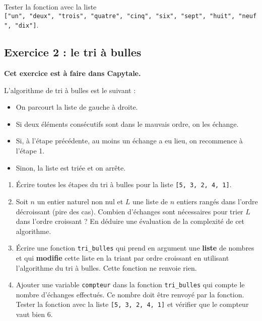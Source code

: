 \documentclass[
  a4paper,
  DIV=11,
  numbers=noendperiod]{scrartcl}
\providecommand{\tightlist}{%
  \setlength{\itemsep}{0pt}\setlength{\parskip}{0pt}}\usepackage{longtable,booktabs,array}
\begin{document}
Tester la fonction avec la liste
\texttt{{[}"un",\ "deux",\ "trois",\ "quatre",\ "cinq",\ "six",\ "sept",\ "huit",\ "neuf",\ "dix"{]}}.

\hypertarget{fa-desktop-exercice-2-le-tri-uxe0-bulles}{%
\subsection{\texorpdfstring{ Exercice 2 : le tri à
bulles}{ Exercice 2 : le tri à bulles}}\label{fa-desktop-exercice-2-le-tri-uxe0-bulles}}

\textbf{Cet exercice est à faire dans Capytale.}

L'algorithme de tri à bulles est le suivant :

\begin{itemize}
\tightlist
\item
  On parcourt la liste de gauche à droite.
\item
  Si deux éléments consécutifs sont dans le mauvais ordre, on les
  échange.
\item
  Si, à l'étape précédente, au moins un échange a eu lieu, on recommence
  à l'étape 1.
\item
  Sinon, la liste est triée et on arrête.
\end{itemize}

\begin{enumerate}
\def\labelenumi{\arabic{enumi}.}
\tightlist
\item
  Écrire toutes les étapes du tri à bulles pour la liste
  \texttt{{[}5,\ 3,\ 2,\ 4,\ 1{]}}.
\item
  Soit \(n\) un entier naturel non nul et \(L\) une liste de \(n\)
  entiers rangés dans l'ordre décroissant (pire des cas). Combien
  d'échanges sont nécessaires pour trier \(L\) dans l'ordre croissant ?
  En déduire une évaluation de la complexité de cet algorithme.
\item
  Écrire une fonction \texttt{tri\_bulles} qui prend en argument une
  \textbf{liste} de nombres et qui \textbf{modifie} cette liste en la
  triant par ordre croissant en utilisant l'algorithme du tri à bulles.
  Cette fonction ne renvoie rien.
\item
  Ajouter une variable \texttt{compteur} dans la fonction
  \texttt{tri\_bulles} qui compte le nombre d'échanges effectués. Ce
  nombre doit être renvoyé par la fonction. Tester la fonction avec la
  liste \texttt{{[}5,\ 3,\ 2,\ 4,\ 1{]}} et vérifier que le compteur
  vaut bien 6.
\end{enumerate}
\end{document}
